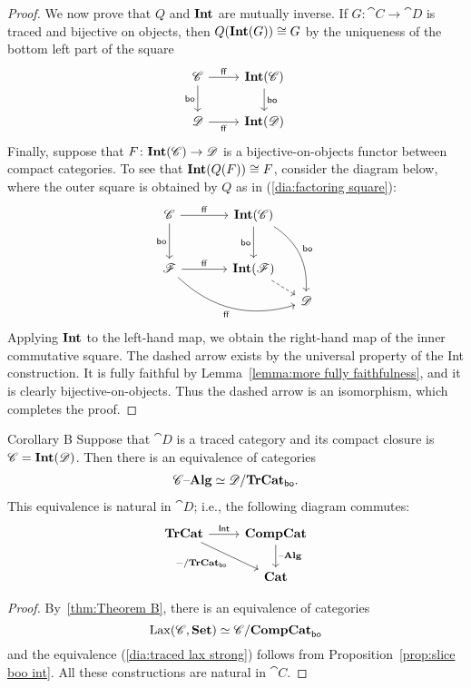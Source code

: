 \documentclass[12pt,oneside,article,draft]{memoir}
\begin{document}
\begin{proof}
   We now prove that $Q$ and $\mathbf{Int}$ are mutually inverse.
   If $G\colon\cat{C}\to\cat{D}$ is traced and bijective on objects, then $Q(\mathbf{Int}(G))\cong G$ by the uniqueness of the bottom left part of the square
   $$
   \begin{tikzcd}
   \cat{C}\arrow[r,"\ff"]\arrow[d,"\bo"']&\Int(\cat{C})\arrow[d,"\bo"]\\
   \cat{D}\arrow[r,"\ff"']&\Int(\cat{D})
   \end{tikzcd}
   $$
   Finally, suppose that $F\colon\mathbf{Int}(\mathscr{C})\to\mathscr{D}$ is a bijective-on-objects functor between compact categories.
   To see that $\mathbf{Int}(Q(F))\cong F$, consider the diagram below, where the outer square is obtained by $Q$ as in (\ref{dia:factoring square}):
   $$
   \begin{tikzcd}[column sep=small, row sep=small]
      \cat{C}\arrow[rr,"\ff"]\arrow[dd,"\bo"']
         &~
         &\Int(\cat{C})\arrow[dd,"\bo"']\arrow[dddr,bend left,"\bo"] \\
      ~ \\
      \cat{F}\arrow[rr,"\ff"]\arrow[drrr,bend right, "\ff"']
         &&\Int(\cat{F})\arrow[dr,dashed] \\
      &&&\cat{D}
   \end{tikzcd}
   $$
   Applying $\mathbf{Int}$ to the left-hand map, we obtain the right-hand map of the inner commutative square.
   The dashed arrow exists by the universal property of the Int construction.
   It is fully faithful by Lemma~\ref{lemma:more fully faithfulness}, and it is clearly bijective-on-objects.
   Thus the dashed arrow is an isomorphism, which completes the proof.
\end{proof}

\begin{named}{Corollary B}\label{cor:Corollary B}
   Suppose that $\cat{D}$ is a traced category and its compact closure is $\mathscr{C}=\mathbf{Int}(\mathscr{D})$.
   Then there is an equivalence of categories
   \begin{align}\label{dia:traced lax strong}
      \mathscr{C}{\text \textendash}\mathbf{Alg}\simeq\mathscr{D}/\mathbf{TrCat}_{\mathsf{bo}}.
   \end{align}
   This equivalence is natural in $\cat{D}$; i.e., the following diagram commutes:
   \begin{equation*}
   \begin{tikzcd}
      \TrCat\ar[r,"\Fun{Int}"]\ar[dr,"-/\TrCat_{\bo}"']
         &\CompCat\ar[d,"\alg"] \\
      &\Cat
   \end{tikzcd}
   \end{equation*}
\end{named}
\begin{proof}
   By~\ref{thm:Theorem B}, there is an equivalence of categories
      $$\operatorname{Lax}(\mathscr{C},\mathbf{Set})\simeq\mathscr{C}/\mathbf{CompCat}_{\mathsf{bo}}$$
   and the equivalence (\ref{dia:traced lax strong}) follows from Proposition~\ref{prop:slice boo int}.
   All these constructions are natural in $\cat{C}$.
\end{proof}
\end{document}
